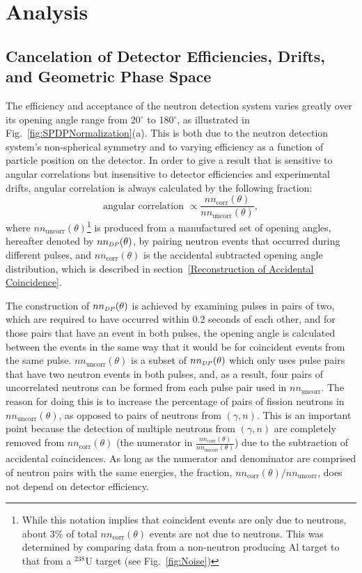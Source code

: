 \section{Analysis}
\label{Analysis}

\subsection{Cancelation of Detector Efficiencies, Drifts, and Geometric Phase Space}
\label{subsec:SPDPCancelation}
The efficiency and acceptance of the neutron detection system varies greatly over its opening angle range from 20$^{\circ}$ to 180$^{\circ}$, as illustrated in Fig.~\ref{fig:SPDPNormalization}(a).
This is both due to the neutron detection system's non-spherical symmetry and to varying efficiency as a function of particle position on the detector.
In order to give a result that is sensitive to angular correlations but insensitive to detector efficiencies and experimental drifts, angular correlation is always calculated by the following fraction:
\begin{displaymath}
\text{angular correlation }  \propto \frac{nn_{\text{corr}}(\theta)}{nn_{\text{uncorr}}(\theta)},
\end{displaymath}
 where $nn_{\text{uncorr}}(\theta)$\footnote{While this notation implies that coincident events are only due to neutrons, about 3\% of total  $nn_{\text{corr}}(\theta)$ events are not due to neutrons. This was determined by comparing data from a non-neutron producing Al target to that from a $^{238}$U target (see Fig.~\ref{fig:Noise})} is produced from a manufactured set of opening angles, hereafter denoted by $nn_{\scaleto{DP}{4pt}}(\theta)$, by pairing neutron events that occurred during different pulses, and $nn_{\text{corr}}(\theta)$ is the accidental subtracted opening angle distribution, which is described in section~\ref{Reconstruction of Accidental Coincidence}.

The construction of $nn_{\scaleto{DP}{4pt}}(\theta)$ is achieved by examining pulses in pairs of two, which are required to have occurred within 0.2 seconds of each other, and for those pairs that have an event in both pulses, the opening angle is calculated between the events in the same way that it would be for coincident events from the same pulse.
$nn_{\text{uncorr}}(\theta)$ is a subset of $nn_{\scaleto{DP}{4pt}}(\theta)$ which only uses pulse pairs that have two neutron events in both pulses, and, as a result, four pairs of uncorrelated neutrons can be formed from each pulse pair used in $nn_{\text{uncorr}}$. 
The reason for doing this is to increase the percentage of pairs of fission neutrons in $nn_{\text{uncorr}}(\theta)$, as opposed to pairs of neutrons from $(\gamma,n)$.
This is an important point because the detection of multiple neutrons from $(\gamma,n)$ are completely removed from $nn_{\text{corr}}(\theta)$ (the numerator in $\frac{nn_{\text{corr}}(\theta)}{nn_{\text{uncorr}}(\theta)}$) due to the subtraction of accidental coincidences.
As long as the numerator and denominator are comprised of neutron pairs with the same energies, the fraction, $nn_{\text{corr}}(\theta)/nn_{\text{uncorr}}$, does not depend on detector efficiency.

